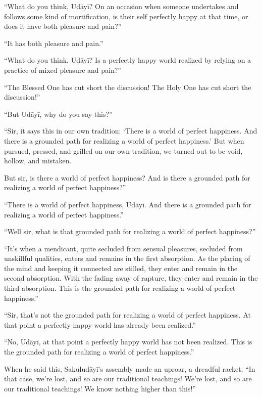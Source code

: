\documentclass[12pt,openany]{book}%
\begin{document}
“What do you think, \textsanskrit{Udāyī}? On an occasion when someone undertakes and follows some kind of mortification, is their self perfectly happy at that time, or does it have both pleasure and pain?” 

“It has both pleasure and pain.” 

“What do you think, \textsanskrit{Udāyī}? Is a perfectly happy world realized by relying on a practice of mixed pleasure and pain?” 

“The Blessed One has cut short the discussion! The Holy One has cut short the discussion!” 

“But \textsanskrit{Udāyī}, why do you say this?” 

“Sir, it says this in our own tradition: ‘There is a world of perfect happiness. And there is a grounded path for realizing a world of perfect happiness.’ But when pursued, pressed, and grilled on our own tradition, we turned out to be void, hollow, and mistaken. 

But sir, is there a world of perfect happiness? And is there a grounded path for realizing a world of perfect happiness?” 

“There is a world of perfect happiness, \textsanskrit{Udāyī}. And there is a grounded path for realizing a world of perfect happiness.” 

“Well sir, what is that grounded path for realizing a world of perfect happiness?” 

“It’s when a mendicant, quite secluded from sensual pleasures, secluded from unskillful qualities, enters and remains in the first absorption. As the placing of the mind and keeping it connected are stilled, they enter and remain in the second absorption. With the fading away of rapture, they enter and remain in the third absorption. This is the grounded path for realizing a world of perfect happiness.” 

“Sir, that’s not the grounded path for realizing a world of perfect happiness. At that point a perfectly happy world has already been realized.” 

“No, \textsanskrit{Udāyī}, at that point a perfectly happy world has not been realized. This is the grounded path for realizing a world of perfect happiness.” 

When he said this, \textsanskrit{Sakuludāyī}’s assembly made an uproar, a dreadful racket, “In that case, we’re lost, and so are our traditional teachings! We’re lost, and so are our traditional teachings! We know nothing higher than this!” 
\end{document}
